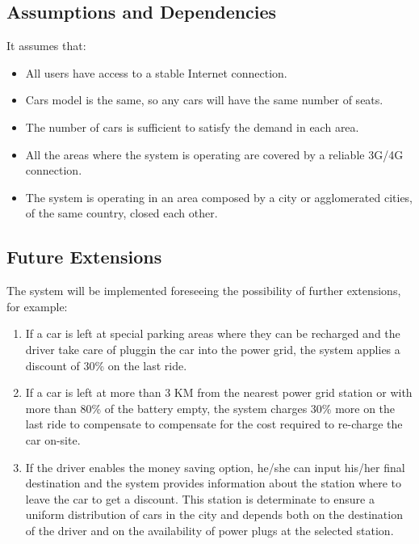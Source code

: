 \subsection{Assumptions and Dependencies}

It assumes that:
\begin{itemize}
	\item All users have access to a stable Internet connection.
	\item Cars model is the same, so any cars will have the same number of seats.
	\item The number of cars is sufficient to satisfy the demand in each area.
	\item All the areas where the system is operating are covered by a reliable 3G/4G connection.
	\item The system is operating in an area composed by a city or agglomerated cities, of the same country, closed each other.
\end{itemize}

\subsection{Future Extensions}
The system will be implemented foreseeing the possibility of further extensions, for example:

\begin{enumerate}
	\item If a car is left at special parking areas where they can be recharged and the driver take care of pluggin the car into the power grid, the system applies a discount of 30\% on the last ride.
	\item If a car is left at more than 3 KM from the nearest power grid station or with more than 80\% of the battery empty, the system charges 30\% more on the last ride to compensate to compensate for the cost required to re-charge the car on-site.
	\item If the driver enables the money saving option, he/she can input his/her final destination and the system provides information about the station where to leave the car to get a discount. This station is determinate to ensure a uniform distribution of cars in the city and depends both on the destination of the driver and on the availability of power plugs at the selected station.
\end{enumerate}